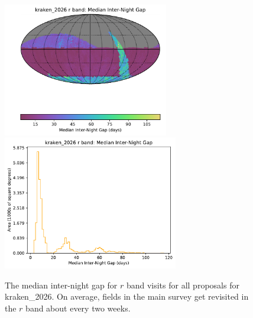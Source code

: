 \documentclass[DM,authoryear,toc]{lsstdoc}
\begin{document}
\begin{figure}[htb]
\centering
\vskip -0.0in
\includegraphics[height=2.3in]{figures/kraken_2026_Median_Inter-Night_Gap_r_band_HEAL_SkyMap.pdf}
\includegraphics[height=2.3in]{figures/kraken_2026_Median_Inter-Night_Gap_r_band_HEAL_Histogram.pdf}
\vskip -0.1in
\caption{The median inter-night gap for $r$ band visits for all proposals for kraken\_2026.
On average, fields in the main survey get revisited in the $r$ band about every two weeks.}
\label{fig:baseline_Gapr}
\end{figure}
\end{document}
